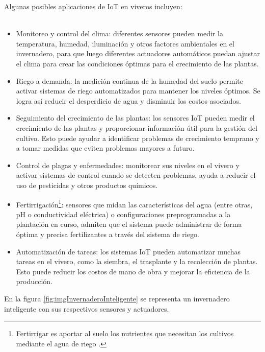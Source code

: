 Algunas posibles aplicaciones de IoT en viveros incluyen:
\\
\\
\begin{itemize}
	\item Monitoreo y control del clima: diferentes sensores pueden medir la temperatura, humedad, iluminación y otros factores ambientales en el invernadero, para que luego diferentes actuadores automáticos puedan ajustar el clima para crear las condiciones óptimas para el crecimiento de las plantas.

    \item Riego a demanda: la medición continua de la humedad del suelo permite activar sistemas de riego automatizados para mantener los niveles óptimos. Se logra así reducir el desperdicio de agua y disminuir los costos asociados.

    \item Seguimiento del crecimiento de las plantas: los sensores IoT pueden medir el crecimiento de las plantas y proporcionar información útil para la gestión del cultivo. Esto puede ayudar a identificar problemas de crecimiento temprano y a tomar medidas que eviten problemas mayores a futuro.

    \item Control de plagas y enfermedades: monitorear sus niveles en el vivero y activar sistemas de control cuando se detecten problemas, ayuda a reducir el uso de pesticidas y otros productos químicos.
    
   \item  Fertirrigación\footnote{Fertirrigar es aportar al suelo los nutrientes que necesitan los cultivos mediante el agua de riego \citep{mapa:1}.}: sensores que midan las características del agua (entre otras, pH o conductividad eléctrica) o configuraciones preprogramadas a la plantación en curso, admiten que el sistema puede administrar de forma óptima y precisa fertilizantes a través del sistema de riego.

    \item Automatización de tareas: los sistemas IoT pueden automatizar muchas tareas en el vivero, como la siembra, el trasplante y la recolección de plantas. Esto puede reducir los costos de mano de obra y mejorar la eficiencia de la producción.
\end{itemize}    

En la figura \ref{fig:imgInvernaderoInteligente} se representa un invernadero inteligente con sus respectivos sensores y actuadores.

